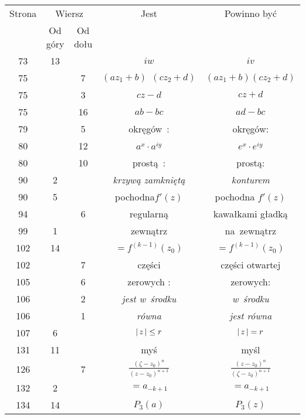 \documentclass[a4paper,11pt]{article}
\begin{document}
\begin{center}
  \begin{tabular}{|c|c|c|c|c|}
    \hline
    Strona & \multicolumn{2}{c|}{Wiersz} & Jest
                              & Powinno być \\ \cline{2-3}
    & Od góry & Od dołu & & \\
    \hline
    73 & 13 & & $iw$ & $iv$ \\
    75 & & \hphantom{0}7 & $( a z_{ 1 } + b )\;\, ( c z_{ 2 } + d )$
           & $( a z_{ 1 } + b ) ( c z_{ 2 } + d )$ \\
    75 & & \hphantom{0}3 & $c z - d$ & $c z + d$ \\
    75 & & 16 & $ab - bc$ & $ad - bc$ \\
    79 & & \hphantom{0}5 & okręgów~: & okręgów: \\
    80 & & 12 & $a^{ x } \cdot a^{ iy }$ & $e^{ x } \cdot e^{ iy }$ \\
    80 & & 10 & prostą~: & prostą: \\
    90 & \hphantom{0}2 & & \textit{krzywą zamkniętą} & \textit{konturem} \\
    \hphantom{0}90 & \hphantom{0}5 & & pochodna$f'( z )$
    & pochodna $f'( z )$ \\
    \hphantom{0}94 & & \hphantom{0}6 & regularną & kawałkami gładką \\
    \hphantom{0}99 & \hphantom{0}1 & & zewnątrz & na~zewnątrz \\
    102 & 14 & & $=\!\! f^{ ( k - 1 ) }( z_{ 0 } )$
           & $= f^{ ( k - 1 ) }( z_{ 0 } )$ \\
    102 & & \hphantom{0}7 & części & części otwartej \\
    105 & & \hphantom{0}6 & zerowych : & zerowych: \\
    106 & & \hphantom{0}2 & \textit{jest w~środku} & \textit{w~środku} \\
    106 & & \hphantom{0}1 & \textit{równa} & \textit{jest równa} \\
    107 & \hphantom{0}6 & & $|\, {  z  } \,| \leq r$ & $|\, {  z  } \,| = r$ \\
    131 & 11 & & myś & myśl \\
    126 & & \hphantom{0}7 & $\frac{ ( \zeta - z_{ 0 } )^{ n } }{ ( z - z_{ 0 } )^{ n + 1 } }$
           & $\frac{ ( z - z_{ 0 } )^{ n } }{ ( \zeta - z_{ 0 } )^{ n + 1 } }$ \\
    132 & \hphantom{0}2 & & $=\!\! a_{ -k + 1 }$ & $= a_{ -k + 1 }$ \\
    134 & 14 & & $P_{ 3 }( a )$ & $P_{ 3 }( z )$ \\

\end{tabular}
\end{center}
\end{document}
